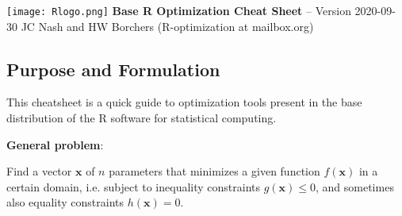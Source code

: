 \documentclass[11pt,a4paper,onecolumn,oneside]{extarticle}
\begin{document}
%
\begin{landscape}

\texttt{[image: Rlogo.png]} 
\hspace{5mm}
\Large{\textbf{Base R Optimization Cheat Sheet} \large-- Version 2020-09-30 \hfill JC Nash and HW Borchers (R-optimization at mailbox.org)}
\small
\begin{multicols}{2}
\section*{\color{darkred} Purpose and Formulation}
This cheatsheet is a quick guide to optimization tools present in the base 
distribution of the R software for statistical computing.

\textbf{General problem}:

Find a vector $\mathbf{x}$ of $n$ parameters that minimizes a given function 
$f(\mathbf{x})$ in a certain domain, i.e. subject to inequality constraints 
$g(\mathbf{x}) \le 0$, and sometimes also equality constraints $h(\mathbf{x}) = 0$.


\end{multicols}
\end{landscape}
\end{document}

